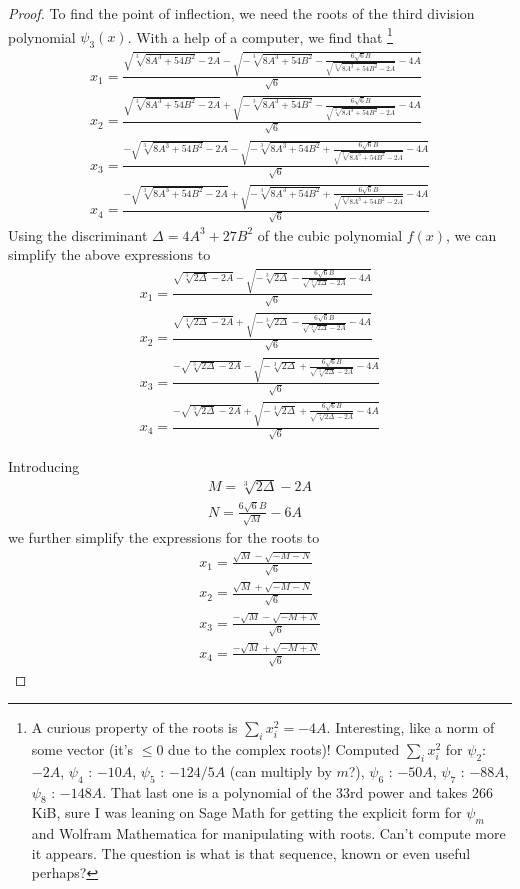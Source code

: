 \documentclass[12pt]{article}
\begin{document}
\begin{proof}
To find the point of inflection, we need the roots of the third division polynomial $\psi_3(x)$. With a help of a computer, we find that \footnote{
    A curious property of the roots is $\sum_i x_i^2 = -4A$.  Interesting, like a norm of some vector (it's $\le 0$ due to the complex roots)!
    Computed $\sum_i x_i^2$ for $\psi_2$: $-2A$,  $\psi_4$ : $-10A$, $\psi_5$ : $-124/5A$ (can multiply by $m$?), $\psi_6$ : $-50A$, $\psi_7$ : $-88A$,
    $\psi_8$ : $-148A$. That last one is a polynomial of the 33rd power and takes 266 KiB, sure I was leaning on Sage Math for getting the explicit form
    for $\psi_m$ and Wolfram Mathematica for manipulating with roots. Can't compute more it appears. The question is what is that sequence, known or
    even useful perhaps?
}
\begin{align}
    x_1 = \frac{ \sqrt{\sqrt[3]{8 A^3+54 B^2}-2 A}-\sqrt{-\sqrt[3]{8 A^3+54 B^2}-\frac{6 \sqrt{6} B}{\sqrt{\sqrt[3]{8 A^3+54 B^2}-2 A}}-4 A}}{\sqrt{6}} \\
    x_2 = \frac{ \sqrt{\sqrt[3]{8 A^3+54 B^2}-2 A}+\sqrt{-\sqrt[3]{8 A^3+54 B^2}-\frac{6 \sqrt{6} B}{\sqrt{\sqrt[3]{8 A^3+54 B^2}-2 A}}-4 A}}{\sqrt{6}} \\
    x_3 = \frac{-\sqrt{\sqrt[3]{8 A^3+54 B^2}-2 A}-\sqrt{-\sqrt[3]{8 A^3+54 B^2}+\frac{6 \sqrt{6} B}{\sqrt{\sqrt[3]{8 A^3+54 B^2}-2 A}}-4 A}}{\sqrt{6}} \\
    x_4 = \frac{-\sqrt{\sqrt[3]{8 A^3+54 B^2}-2 A}+\sqrt{-\sqrt[3]{8 A^3+54 B^2}+\frac{6 \sqrt{6} B}{\sqrt{\sqrt[3]{8 A^3+54 B^2}-2 A}}-4 A}}{\sqrt{6}}
\end{align}
Using the discriminant $\Delta = 4A^3 + 27B^2$ of the cubic polynomial $f(x)$, we can simplify the above expressions to
\begin{align}
    x_1 = \frac{ \sqrt{\sqrt[3]{2 \Delta}-2 A}-\sqrt{-\sqrt[3]{2 \Delta}-\frac{6 \sqrt{6} B}{\sqrt{\sqrt[3]{2 \Delta}-2 A}}-4 A}}{\sqrt{6}} \\
    x_2 = \frac{ \sqrt{\sqrt[3]{2 \Delta}-2 A}+\sqrt{-\sqrt[3]{2 \Delta}-\frac{6 \sqrt{6} B}{\sqrt{\sqrt[3]{2 \Delta}-2 A}}-4 A}}{\sqrt{6}} \\
    x_3 = \frac{-\sqrt{\sqrt[3]{2 \Delta}-2 A}-\sqrt{-\sqrt[3]{2 \Delta}+\frac{6 \sqrt{6} B}{\sqrt{\sqrt[3]{2 \Delta}-2 A}}-4 A}}{\sqrt{6}} \\
    x_4 = \frac{-\sqrt{\sqrt[3]{2 \Delta}-2 A}+\sqrt{-\sqrt[3]{2 \Delta}+\frac{6 \sqrt{6} B}{\sqrt{\sqrt[3]{2 \Delta}-2 A}}-4 A}}{\sqrt{6}}
\end{align}

Introducing
\begin{align}
    M = \sqrt[3]{2 \Delta} - 2A \\
    N = \frac{6 \sqrt{6} B}{\sqrt{M}} - 6A
\end{align}
we further simplify the expressions for the roots to
\begin{align}
    x_1 = \frac{ \sqrt{M}-\sqrt{-M-N}}{\sqrt{6}} \\
    x_2 = \frac{ \sqrt{M}+\sqrt{-M-N}}{\sqrt{6}} \\
    x_3 = \frac{-\sqrt{M}-\sqrt{-M+N}}{\sqrt{6}} \\
    x_4 = \frac{-\sqrt{M}+\sqrt{-M+N}}{\sqrt{6}}
\end{align}


\end{proof}
\end{document}
